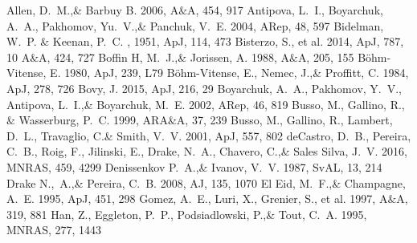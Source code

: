 \documentclass[a4paper,fleqn,usenatbib]{mnras}
\begin{document}
 


\begin{thebibliography}{99}
Allen, D.~M.,\& Barbuy B. 2006, 
A$\&$A, 454, 917
Antipova, L.~I., Boyarchuk, A.~A., Pakhomov, Yu.~V.,\& Panchuk, V.~E. 2004, 
ARep, 48, 597
Bidelman, W.~P. \& Keenan, P.~C. , 1951, ApJ, 114, 473
Bisterzo, S., et al. 2014, 
ApJ, 787, 10
A$\&$A, 424, 727
Boffin H, M.~J.,\& Jorissen, A. 1988, 
A$\&$A, 205, 155
B\"ohm-Vitense, E. 1980, 
ApJ, 239, L79
B\"ohm-Vitense, E., Nemec, J.,\& Proffitt, C. 1984, 
ApJ, 278, 726
Bovy, J. 2015, 
ApJ, 216, 29
Boyarchuk, A.~A., Pakhomov, Y.~V., Antipova, L.~I.,\& Boyarchuk, M.~E. 2002, 
ARep, 46, 819
Busso, M., Gallino, R., \& Wasserburg, P.~C. 1999, 
ARA$\&$A, 37, 239
Busso, M., Gallino, R., Lambert, D.~L., Travaglio, C.\& Smith, V.~V. 2001, 
ApJ, 557, 802
deCastro, D.~B., Pereira, C.~B., Roig, F., Jilinski, E., Drake, N.~A., Chavero, C.,\& Sales Silva, J.~V. 2016, 
MNRAS, 459, 4299
Denissenkov P.~A.,\& Ivanov, V.~V. 1987, 
SvAL, 13, 214
Drake N.,~A.,\& Pereira, C.~B. 2008, 
AJ, 135, 1070
El Eid, M.~F.,\& Champagne, A.~E. 1995, 
ApJ, 451, 298
Gomez, A.~E., Luri, X., Grenier, S., et al. 1997, 
A$\&$A, 319, 881
Han, Z., Eggleton, P.~P., Podsiadlowski, P.,\& Tout, C.~A. 1995, 
MNRAS, 277, 1443

\end{thebibliography}
\end{document}
